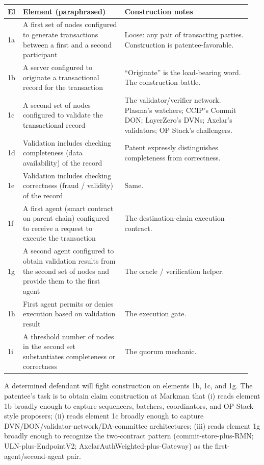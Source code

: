 \documentclass[11pt,letterpaper]{article}
\begin{document}
\begin{longtable}{p{0.05\linewidth}p{0.4\linewidth}p{0.5\linewidth}}
\toprule
\textbf{El} & \textbf{Element (paraphrased)} & \textbf{Construction notes} \\
\midrule
1a & A first set of nodes configured to generate transactions between a first and a second participant & Loose: any pair of transacting parties. Construction is patentee-favorable. \\
1b & A server configured to originate a transactional record for the transaction & ``Originate'' is the load-bearing word. The construction battle. \\
1c & A second set of nodes configured to validate the transactional record & The validator/verifier network. Plasma's watchers; CCIP's Commit DON; LayerZero's DVNs; Axelar's validators; OP Stack's challengers. \\
1d & Validation includes checking completeness (data availability) of the record & Patent expressly distinguishes completeness from correctness. \\
1e & Validation includes checking correctness (fraud / validity) of the record & Same. \\
1f & A first agent (smart contract on parent chain) configured to receive a request to execute the transaction & The destination-chain execution contract. \\
1g & A second agent configured to obtain validation results from the second set of nodes and provide them to the first agent & The oracle / verification helper. \\
1h & First agent permits or denies execution based on validation result & The execution gate. \\
1i & A threshold number of nodes in the second set substantiates completeness or correctness & The quorum mechanic. \\
\bottomrule
\end{longtable}

A determined defendant will fight construction on elements 1b, 1c, and 1g. The patentee's task is to obtain claim construction at Markman that (i) reads element 1b broadly enough to capture sequencers, batchers, coordinators, and OP-Stack-style proposers; (ii) reads element 1c broadly enough to capture DVN/DON/validator-network/DA-committee architectures; (iii) reads element 1g broadly enough to recognize the two-contract pattern (commit-store-plus-RMN; ULN-plus-EndpointV2; AxelarAuthWeighted-plus-Gateway) as the first-agent/second-agent pair.
\end{document}
